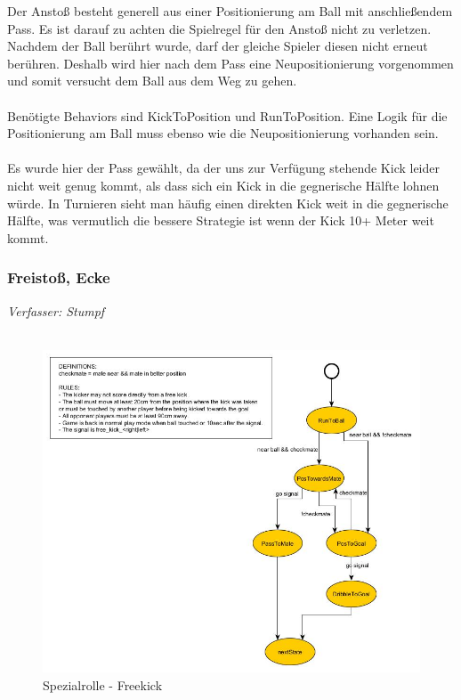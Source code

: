 \documentclass[fontsize=12pt,a4paper,final]{scrartcl}[2003/01/01]
\begin{document}
Der Ansto{\ss} besteht generell aus einer Positionierung am Ball mit anschließendem Pass. Es ist darauf zu achten die Spielregel für den Ansto{\ss} nicht zu verletzen. Nachdem der Ball berührt wurde, darf der gleiche Spieler diesen nicht erneut berühren. Deshalb wird hier nach dem Pass eine Neupositionierung vorgenommen und somit versucht dem Ball aus dem Weg zu gehen.\\
\\
Benötigte Behaviors sind KickToPosition und RunToPosition. Eine Logik für die Positionierung am Ball muss ebenso wie die Neupositionierung vorhanden sein.\\
\\
Es wurde hier der Pass gewählt, da der uns zur Verfügung stehende Kick leider nicht weit genug kommt, als dass sich ein Kick in die gegnerische Hälfte lohnen würde. In Turnieren sieht man häufig einen direkten Kick weit in die gegnerische Hälfte, was vermutlich die bessere Strategie ist wenn der Kick 10+ Meter weit kommt.

\subsubsection{Freisto{\ss}, Ecke}
\textit{Verfasser: Stumpf}\\
\\
\begin{figure}[H]
	\centering
	\includegraphics[width=\textwidth]{Grafiken/KI/Standardsituationen/FreeKickSM}
	\caption{Spezialrolle - Freekick}
	\label{fig:Standard - Freekick, Cornerkick}
\end{figure}
\end{document}
